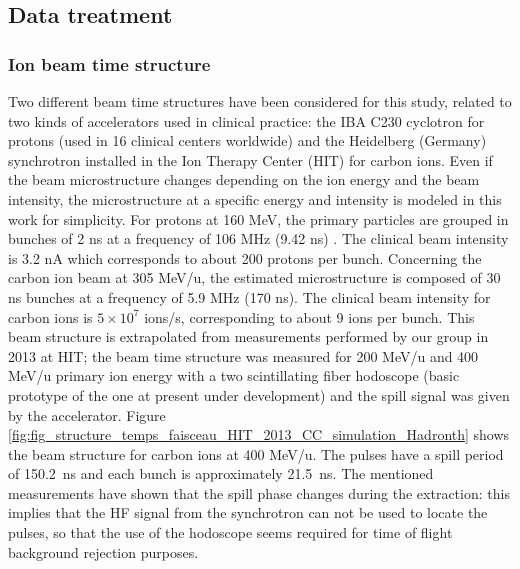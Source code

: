 \subsection{Data treatment}
\label{subsection:Treatment_data_CC_hadrontherapy_Geant4}

\subsubsection{Ion beam time structure}
\label{subsubsection:modelisation_fasceau_ions_CC_hadrontherapy_Geant4}
 
Two different beam time structures have been considered for this study, related to two kinds of accelerators used in clinical practice: the IBA C230 cyclotron for protons (used in 16 clinical centers worldwide) and the Heidelberg (Germany) synchrotron installed in the Ion Therapy Center (HIT) for carbon ions. Even if the beam microstructure changes depending on the ion energy and the beam intensity, the microstructure at a specific energy and intensity is modeled in this work for simplicity. For protons at 160 MeV, the primary particles are grouped in bunches of 2 ns at a frequency of 106 MHz (9.42 ns) \cite{f_roellinghoff_real-time_2014}. The clinical beam intensity is 3.2 nA which corresponds to about 200 protons per bunch. Concerning the carbon ion beam at 305 MeV/u, the estimated microstructure is composed of 30 ns bunches at a frequency of 5.9 MHz (170 ns). The clinical beam intensity for carbon ions is $5\times10^7$ ions/s, corresponding to about 9 ions per bunch. This beam structure is extrapolated from measurements performed by our group in 2013 at HIT; the beam time structure was measured for 200 MeV/u and 400 MeV/u primary ion energy with a two scintillating fiber hodoscope (basic prototype of the one at present under development) and the spill signal was given by the accelerator. Figure \ref{fig:fig_structure_temps_faisceau_HIT_2013_CC_simulation_Hadronth} shows the beam structure for carbon ions at 400 MeV/u. The pulses have a spill period of 150.2~ns and each bunch is approximately 21.5~ns.
The mentioned measurements have shown that the spill phase changes during the extraction: this implies that the HF signal from the synchrotron can not be used to locate the pulses, so that the use of the hodoscope seems required for time of flight background rejection purposes.\newline

